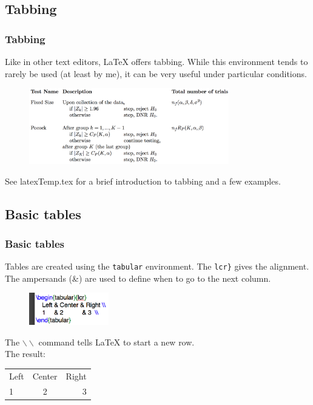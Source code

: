 \documentclass[slidestop,compress,mathserif]{beamer}
\begin{document}
\subsection[Tabbing]{Tabbing}
\begin{frame} \frametitle{Tabbing}
	Like in other text editors, LaTeX offers tabbing. While this environment tends to rarely be used (at least by me), it can be very useful under particular conditions.
	\begin{figure}[htbp]
		\centering
		\includegraphics[height=1.3in]{basicsOfLatex/tabTable/tabbingExample}
	\end{figure}
	See {\color{highlight}latexTemp.tex} for a brief introduction to tabbing and a few examples.
\end{frame}

\subsection[Basic tables]{Basic tables}
\begin{frame} \frametitle{Basic tables}
	Tables are created using the \texttt{\color{highlight}tabular} environment. The \text{\color{braces}\{}\texttt{lcr}\texttt{\color{braces}\}} gives the alignment. The ampersands ({\color{highlight}\&}) are used to define when to go to the next column.
	\begin{figure}[htbp]
		\centering
		\includegraphics[height=0.55in]{basicsOfLatex/tabTable/basicTable}
	\end{figure}
	The \texttt{\color{command}$\backslash\backslash$} command tells LaTeX to start a new row.  \\
	\vspace{0.3cm}
	The result: \\
	\vspace{0.3cm}
	\begin{tabular}{lcr} %
		Left & Center & Right \\ %
		1     & 2           & 3  \\
	\end{tabular}
\end{frame}
\end{document}
